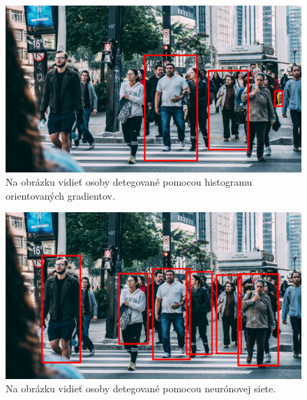 \begin{figure}[H]
\centerline{\includegraphics[width=1\textwidth]{images/detect_hog}}
\caption[Detekcia pomocou histogramu orientovaných gradientov]{Na obrázku vidieť osoby detegované pomocou histogramu orientovaných gradientov.}
\label{obr:detect_hog}
\end{figure}

\begin{figure}[H]
\centerline{\includegraphics[width=1\textwidth]{images/detect_cnn}}
\caption[Detekcia neurónovou sieťou]{Na obrázku vidieť osoby detegované pomocou neurónovej siete.}
\label{obr:detect_cnn}
\end{figure}